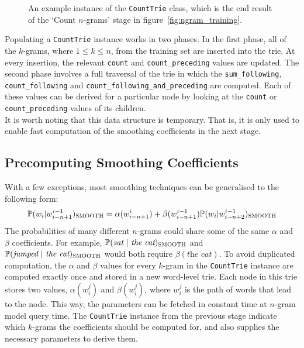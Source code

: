 \documentclass[a4paper, 12pt]{report}
\newcommand{\ttt}[1]{\texttt{#1}}
\newcommand{\tit}[1]{\textit{#1}}
\begin{document}
\begin{figure}[h]
\caption{An example instance of the \ttt{CountTrie} class, which is the end result of the `Count $n$-grams' stage in figure~\ref{fig:ngram_training}.}
\label{fig:count_trie}
\end{figure}

Populating a \ttt{CountTrie} instance works in two phases. In the first phase, all of the $k$-grams, where $1 \leq k \leq n$, from the training set are inserted into the trie. At every insertion, the relevant \ttt{count} and \ttt{count\_preceding} values are updated. The second phase involves a full traversal of the trie in which the \ttt{sum\_following}, \ttt{count\_following} and \ttt{count\_following\_and\_preceding} are computed. Each of these values can be derived for a particular node by looking at the \ttt{count} or \ttt{count\_preceding} values of its children. \\

It is worth noting that this data structure is temporary. That is, it is only used to enable fast computation of the smoothing coefficients in the next stage.

\subsection{Precomputing Smoothing Coefficients} \label{ngram_precompute}

With a few exceptions, most smoothing techniques can be generalised to the following form:
\begin{gather} \label{eq:smoothing_general}
	\mathbb{P}(w_i | w_{i - n + 1}^{i - 1})_{\text{\scshape SMOOTH}} = \alpha(w_{i - n + 1}^i) + \beta(w_{i - n + 1}^{i - 1})\mathbb{P}(w_i | w_{i - n + 2}^{i - 1})_{\text{\scshape SMOOTH}}
\end{gather}
The probabilities of many different $n$-grams could share some of the same $\alpha$ and $\beta$ coefficients. For example, $\mathbb{P}(\tit{sat}\ |\ \tit{the cat})_{\text{\scshape SMOOTH}}$ and $\mathbb{P}(\tit{jumped}\ |\ \tit{the cat})_{\text{\scshape SMOOTH}}$ would both require $\beta(\tit{the cat})$. To avoid duplicated computation, the $\alpha$ and $\beta$ values for every $k$-gram in the \ttt{CountTrie} instance are computed exactly once and stored in a new word-level trie. Each node in this trie stores two values, $\alpha(w_i^j)$ and $\beta(w_i^j)$, where $w_i^j$ is the path of words that lead to the node. This way, the parameters can be fetched in constant time at $n$-gram model query time. The \ttt{CountTrie} instance from the previous stage indicate which $k$-grams the coefficients should be computed for, and also supplies the necessary parameters to derive them. \\
\end{document}
